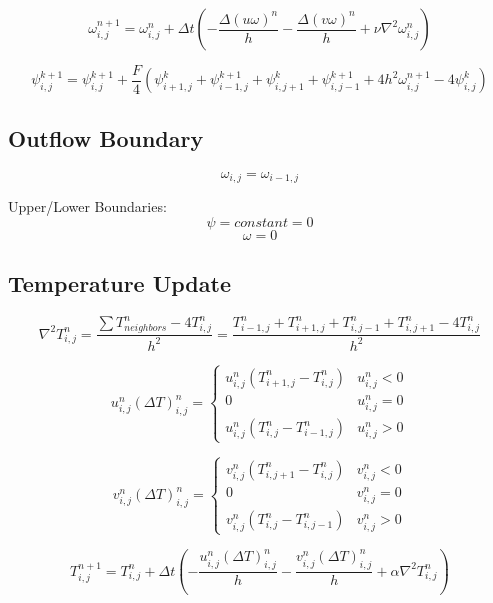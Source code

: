 \begin{equation}
    \omega_{i, j}^{n + 1} = \omega_{i, j}^{n} + \Delta t \left( -\frac{\Delta(u \omega)^n}{h} - \frac{\Delta(v \omega) ^n}{h} + \nu \nabla^2\omega_{i, j}^{n} \right)
\end{equation}

\begin{equation}
    \psi_{i, j}^{k + 1} =  \psi_{i, j}^{k + 1} + \frac{F}{4} \left( \psi_{i + 1, j}^{k} + \psi_{i - 1, j}^{k + 1} + \psi_{i, j + 1}^{k} + \psi_{i, j - 1}^{k + 1} + 4 h^2 \omega_{i, j}^{n + 1} - 4\psi_{i, j}^{k} \right)
\end{equation}

\subsection{Outflow Boundary}
\begin{equation}
    \omega_{i, j} = \omega_{i - 1, j}
\end{equation}

Upper/Lower Boundaries: 
\begin{equation}
    \psi = constant = 0
\end{equation}
\begin{equation}
    \omega = 0
\end{equation}


\subsection{Temperature Update}
\begin{equation}
    \nabla^2 T_{i, j}^{n} = \frac{\sum T_{neighbors}^{n} - 4 T_{i, j}^{n}}{h^2} = \frac{T_{i - 1, j}^{n} + T_{i + 1, j}^{n} + T_{i, j - 1}^{n} + T_{i, j + 1}^{n} - 4 T_{i, j}^{n}}{h^2}
\end{equation}


\begin{equation}
    u_{i, j}^{n} (\Delta T)_{i, j}^{n} = \begin{cases} 
          u_{i, j}^{n} \left( T_{i + 1, j}^{n} - T_{i, j}^{n} \right) & u_{i, j}^{n} < 0 \\
          0 & u_{i, j}^n = 0 \\
          u_{i, j}^{n} \left( T_{i, j}^{n} - T_{i - 1, j}^{n} \right) & u_{i, j}^n > 0 
       \end{cases}
\end{equation}

\begin{equation}
    v_{i, j}^{n} (\Delta T)_{i, j}^{n} = \begin{cases} 
          v_{i, j}^{n} \left( T_{i, j + 1}^{n} - T_{i, j}^{n} \right) & v_{i, j}^{n} < 0 \\
          0 & v_{i, j}^n = 0 \\
          v_{i, j}^{n} \left( T_{i, j}^{n} - T_{i, j - 1}^{n} \right) & v_{i, j}^n > 0 
       \end{cases}
\end{equation}





\begin{equation}
    T_{i, j}^{n + 1} = T_{i, j}^{n} + \Delta t \left( -\frac{u_{i, j}^{n} (\Delta T)_{i, j}^{n}}{h} - \frac{ v_{i, j}^{n} (\Delta T)_{i, j}^{n}}{h} + \alpha \nabla^2 T_{i, j}^{n} \right)
\end{equation}

\clearpage